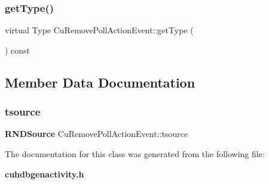 \subsubsection{getType()}
{\footnotesize\ttfamily virtual Type Cu\+Remove\+Poll\+Action\+Event\+::get\+Type (\begin{DoxyParamCaption}{ }\end{DoxyParamCaption}) const\hspace{0.3cm}{\ttfamily [virtual]}}



\subsection{Member Data Documentation}
\mbox{\label{classCuRemovePollActionEvent_a4150fed683c5dca6437bfd1ee6a63377}} 
\subsubsection{tsource}
{\footnotesize\ttfamily \textbf{ R\+N\+D\+Source} Cu\+Remove\+Poll\+Action\+Event\+::tsource}



The documentation for this class was generated from the following file\+:\begin{DoxyCompactItemize}
\item 
\textbf{ cuhdbgenactivity.\+h}\end{DoxyCompactItemize}
